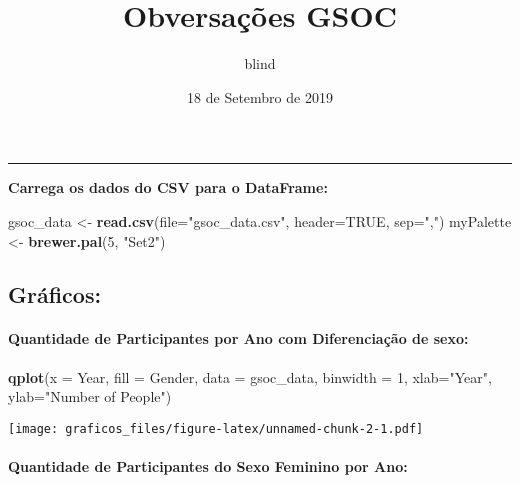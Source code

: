 \documentclass[
]{article}
\title{Obversações GSOC}
\author{blind}
\date{18 de Setembro de 2019}
\newenvironment{Shaded}{\begin{snugshade}}{\end{snugshade}}
\newcommand{\DataTypeTok}[1]{\textcolor[rgb]{0.13,0.29,0.53}{#1}}
\newcommand{\DecValTok}[1]{\textcolor[rgb]{0.00,0.00,0.81}{#1}}
\newcommand{\KeywordTok}[1]{\textcolor[rgb]{0.13,0.29,0.53}{\textbf{#1}}}
\newcommand{\NormalTok}[1]{#1}
\newcommand{\OtherTok}[1]{\textcolor[rgb]{0.56,0.35,0.01}{#1}}
\newcommand{\StringTok}[1]{\textcolor[rgb]{0.31,0.60,0.02}{#1}}
\begin{document}
\maketitle

\begin{center}\rule{0.5\linewidth}{0.5pt}\end{center}

\textbf{Carrega os dados do CSV para o DataFrame:}

\begin{Shaded}
\begin{Highlighting}[]
\NormalTok{gsoc_data <-}\StringTok{ }\KeywordTok{read.csv}\NormalTok{(}\DataTypeTok{file=}\StringTok{"gsoc_data.csv"}\NormalTok{, }\DataTypeTok{header=}\OtherTok{TRUE}\NormalTok{, }\DataTypeTok{sep=}\StringTok{","}\NormalTok{)}
\NormalTok{myPalette <-}\StringTok{ }\KeywordTok{brewer.pal}\NormalTok{(}\DecValTok{5}\NormalTok{, }\StringTok{"Set2"}\NormalTok{) }
\end{Highlighting}
\end{Shaded}

\hypertarget{gruxe1ficos}{%
\subsection{Gráficos:}\label{gruxe1ficos}}

\hypertarget{quantidade-de-participantes-por-ano-com-diferenciauxe7uxe3o-de-sexo}{%
\paragraph{Quantidade de Participantes por Ano com Diferenciação de
sexo:}\label{quantidade-de-participantes-por-ano-com-diferenciauxe7uxe3o-de-sexo}}

\begin{Shaded}
\begin{Highlighting}[]
\KeywordTok{qplot}\NormalTok{(}\DataTypeTok{x =}\NormalTok{ Year, }\DataTypeTok{fill =}\NormalTok{ Gender, }\DataTypeTok{data =}\NormalTok{ gsoc_data, }\DataTypeTok{binwidth =} \DecValTok{1}\NormalTok{, }\DataTypeTok{xlab=}\StringTok{"Year"}\NormalTok{, }\DataTypeTok{ylab=}\StringTok{"Number of People"}\NormalTok{)}
\end{Highlighting}
\end{Shaded}

\texttt{[image: graficos\_files/figure-latex/unnamed-chunk-2-1.pdf]}

\hypertarget{quantidade-de-participantes-do-sexo-feminino-por-ano}{%
\paragraph{Quantidade de Participantes do Sexo Feminino por
Ano:}\label{quantidade-de-participantes-do-sexo-feminino-por-ano}}
\end{document}
